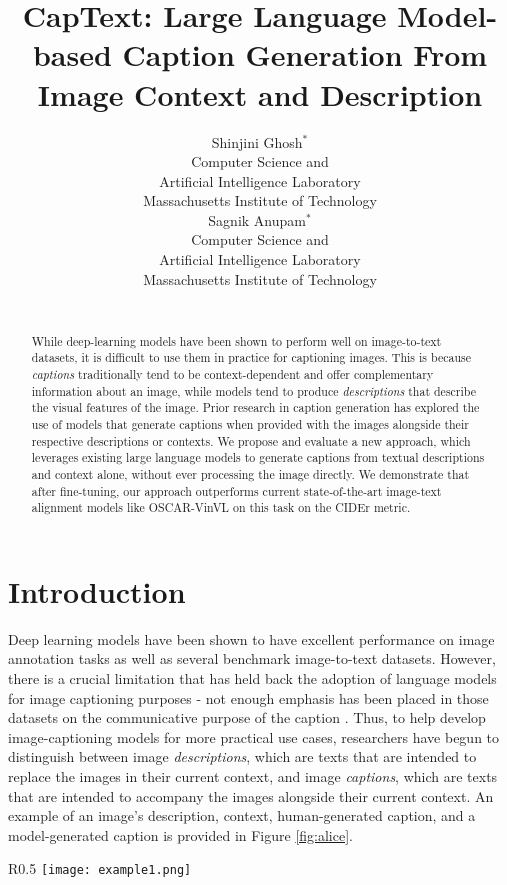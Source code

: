 \documentclass[11pt]{article}
\title{CapText: Large Language Model-based Caption Generation From Image Context and Description}
\author{
  Shinjini Ghosh$^*$ \\
  Computer Science and \\
  Artificial Intelligence Laboratory \\
  Massachusetts Institute of Technology \\
  \And 
  Sagnik Anupam$^*$ \\
  Computer Science and \\
  Artificial Intelligence Laboratory \\
  Massachusetts Institute of Technology \\
\\}
\begin{document}
\maketitle
\def\thefootnote{*}

\begin{abstract}
While deep-learning models have been shown to perform well on image-to-text datasets, it is difficult to use them in practice for captioning images. This is because \textit{captions} traditionally tend to be context-dependent and offer complementary information about an image, while models tend to produce \textit{descriptions} that describe the visual features of the image. Prior research in caption generation has explored the use of models that generate captions when provided with the images alongside their respective descriptions or contexts. We propose and evaluate a new approach, which leverages existing large language models to generate captions from textual descriptions and context alone, without ever processing the image directly. We demonstrate that after fine-tuning, our approach outperforms current state-of-the-art image-text alignment models like OSCAR-VinVL on this task on the CIDEr metric.
\end{abstract}

\section{Introduction}

Deep learning models have been shown to have excellent performance on image annotation tasks as well as several benchmark image-to-text datasets. However, there is a crucial limitation that has held back the adoption of language models for image captioning purposes - not enough emphasis has been placed in those datasets on the communicative purpose of the caption \citep{kreiss2021concadia}. Thus, to help develop image-captioning models for more practical use cases, researchers have begun to distinguish between image \textit{descriptions}, which are texts that are intended to replace the images in their current context, and image \textit{captions}, which are texts that are intended to accompany the images alongside their current context. An example of an image's description, context, human-generated caption, and a model-generated caption is provided in Figure \ref{fig:alice}.

\begin{wrapfigure}{R}{0.5\textwidth}
    \centering
    \texttt{[image: example1.png]}
    \caption{Caption generation for an illustration from Alice in Wonderland, taken from \url{https://commons.wikimedia.org/wiki/File:Alice_05a-1116x1492.jpg}}
    \label{fig:alice}
\end{wrapfigure}
\end{document}
